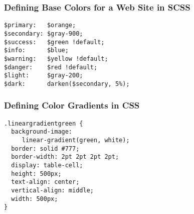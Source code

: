 \documentclass[14pt,aspectratio=169]{beamer}
\begin{document}
%
\begin{frame}[fragile]
  \frametitle{Defining Base Colors for a Web Site in SCSS}
  \normalsize
  \begin{minipage}{6in}
    \vspace*{.1in}
    \begin{verbatim}
$primary:   $orange;
$secondary: $gray-900;
$success:   $green !default;
$info:      $blue;
$warning:   $yellow !default;
$danger:    $red !default;
$light:     $gray-200;
$dark:      darken($secondary, 5%);
    \end{verbatim}
  \end{minipage}
\end{frame}

%
\begin{frame}[fragile]
  \frametitle{Defining Color Gradients in CSS}
  \normalsize
  \begin{minipage}{6in}
    \vspace*{.1in}
    \begin{verbatim}
.lineargradientgreen {
  background-image:
     linear-gradient(green, white);
  border: solid #777;
  border-width: 2pt 2pt 2pt 2pt;
  display: table-cell;
  height: 500px;
  text-align: center;
  vertical-align: middle;
  width: 500px;
}
    \end{verbatim}
  \end{minipage}
\end{frame}
\end{document}
